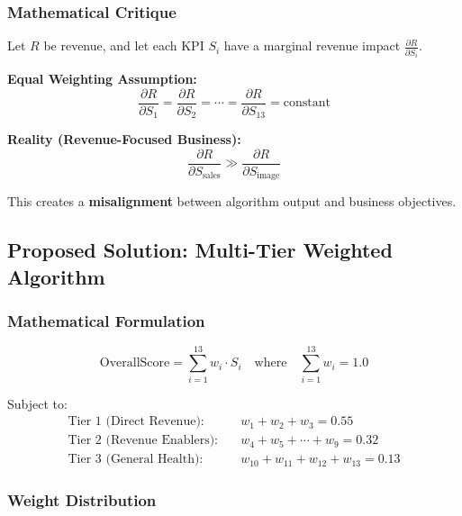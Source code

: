 \documentclass[12pt,a4paper]{article}
\begin{document}
\subsubsection{Mathematical Critique}

Let $R$ be revenue, and let each KPI $S_i$ have a marginal revenue impact $\frac{\partial R}{\partial S_i}$.

\textbf{Equal Weighting Assumption:}
\begin{equation}
\frac{\partial R}{\partial S_1} = \frac{\partial R}{\partial S_2} = \cdots = \frac{\partial R}{\partial S_{13}} = \text{constant}
\end{equation}

\textbf{Reality (Revenue-Focused Business):}
\begin{equation}
\frac{\partial R}{\partial S_{\text{sales}}} \gg \frac{\partial R}{\partial S_{\text{image}}}
\end{equation}

This creates a \textbf{misalignment} between algorithm output and business objectives.

\subsection{Proposed Solution: Multi-Tier Weighted Algorithm}

\subsubsection{Mathematical Formulation}

\begin{equation}
\text{OverallScore} = \sum_{i=1}^{13} w_i \cdot S_i \quad \text{where} \quad \sum_{i=1}^{13} w_i = 1.0
\end{equation}

Subject to:
\begin{align}
\text{Tier 1 (Direct Revenue):} \quad &w_1 + w_2 + w_3 = 0.55 \\
\text{Tier 2 (Revenue Enablers):} \quad &w_4 + w_5 + \cdots + w_9 = 0.32 \\
\text{Tier 3 (General Health):} \quad &w_{10} + w_{11} + w_{12} + w_{13} = 0.13
\end{align}

\subsubsection{Weight Distribution}
\end{document}

